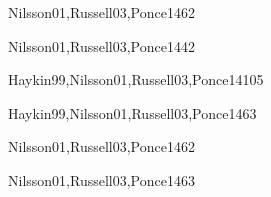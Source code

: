 \begin{syllabus}
\begin{unit}{\ISAgentsDef}{Nilsson01,Russell03,Ponce14}{6}{2}
    \ISAgentsAllTopics
    \ISAgentsAllObjectives
\end{unit}

\begin{unit}{\ISNaturalLanguageProcessingDef}{Nilsson01,Russell03,Ponce14}{4}{2}
    \ISNaturalLanguageProcessingAllTopics
    \ISNaturalLanguageProcessingAllObjectives
\end{unit}

\begin{unit}{\ISMachineLearningDef}{Haykin99,Nilsson01,Russell03,Ponce14}{10}{5}
    \ISMachineLearningAllTopics
    \ISMachineLearningAllObjectives
\end{unit}

\begin{unit}{\ISPlanningSystemsDef}{Haykin99,Nilsson01,Russell03,Ponce14}{6}{3}
    \ISPlanningSystemsAllTopics
    \ISPlanningSystemsAllObjectives
\end{unit}

\begin{unit}{\ISRoboticsDef}{Nilsson01,Russell03,Ponce14}{6}{2}
    \ISRoboticsAllTopics
    \ISRoboticsAllObjectives
\end{unit}

\begin{unit}{\ISPerceptionDef}{Nilsson01,Russell03,Ponce14}{6}{3}
    \ISPerceptionAllTopics
    \ISPerceptionAllObjectives
\end{unit}



\begin{coursebibliography}
\end{coursebibliography}

\end{syllabus}
